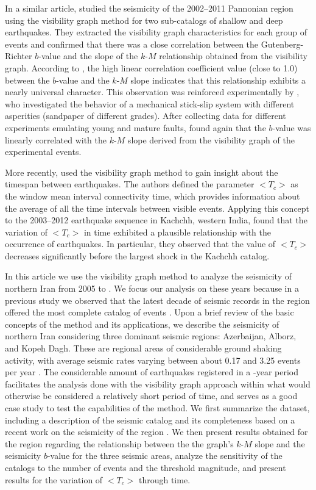 In a similar article, \citet{Telesca2014} studied the seismicity of the 2002--2011 Pannonian region using the visibility graph method for two sub-catalogs of shallow and deep earthquakes. They extracted the visibility graph characteristics for each group of events and confirmed that there was a close correlation between the Gutenberg-Richter $b$-value and the slope of the $k$-$M$ relationship obtained from the visibility graph. According to \citet{Telesca2014}, the high linear correlation coefficient value (close to 1.0) between the $b$-value and the $k$-$M$ slope indicates that this relationship exhibits a nearly universal character. This observation was reinforced experimentally by \citet{Telesca2014-pone}, who investigated the behavior of a mechanical stick-slip system with different asperities (sandpaper of different grades). After collecting data for different experiments emulating young and mature faults, \citet{Telesca2014-pone} found again that the $b$-value was linearly correlated with the $k$-$M$ slope derived from the visibility graph of the experimental events.

More recently, \citet{Telesca2016} used the visibility graph method to gain insight about the timespan between earthquakes. The authors defined the parameter $<$$T_c$$>$ as the window mean interval connectivity time, which provides information about the average of all the time intervals between visible events. Applying this concept to the 2003--2012 earthquake sequence in Kachchh, western India, \citet{Telesca2016} found that the variation of $<$$T_c$$>$ in time exhibited a plausible relationship with the occurrence of earthquakes. In particular, they observed that the value of $<$$T_c$$>$ decreases significantly before the largest shock in the Kachchh catalog.

In this article we use the visibility graph method to analyze the seismicity of northern Iran from 2005 to . We focus our analysis on these years because in a previous study we observed that the latest decade of seismic records in the region offered the most complete catalog of events \citep[][]{Khoshnevis2017}. Upon a brief review of the basic concepts of the method and its applications, we describe the seismicity of northern Iran considering three dominant seismic regions: Azerbaijan, Alborz, and Kopeh Dagh. These are regional areas of considerable ground shaking activity, with average seismic rates varying between about 0.17 and 3.25 events per year \citep[e.g.,][]{Nemati2015}. The considerable amount of earthquakes registered in a -year period facilitates the analysis done with the visibility graph approach within what would otherwise be considered a relatively short period of time, and serves as a good case study to test the capabilities of the method. We first summarize the dataset, including a description of the seismic catalog and its completeness based on a recent work on the seismicity of the region \citep{Khoshnevis2017}. We then present results obtained for the region regarding the relationship between the the graph's $k$-$M$ slope and the seismicity $b$-value for the three seismic areas, analyze the sensitivity of the catalogs to the number of events and the threshold magnitude, and present results for the variation of $<$$T_c$$>$ through time.
